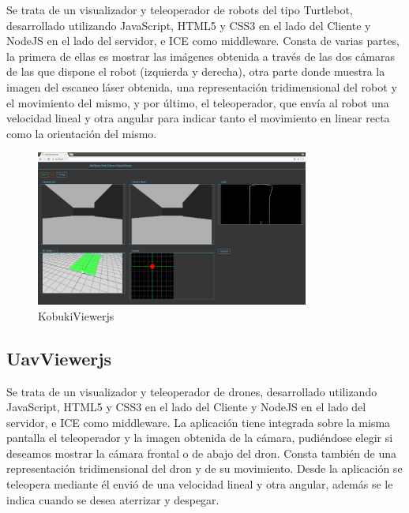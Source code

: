 Se trata de un visualizador y teleoperador de robots del tipo Turtlebot, desarrollado utilizando JavaScript, HTML5 y CSS3 en el lado del Cliente y NodeJS en el lado del servidor, e ICE como middleware. Consta de varias partes, la primera de ellas es mostrar las imágenes obtenida a través de las dos cámaras de las que dispone el robot (izquierda y derecha), otra parte donde muestra la imagen del escaneo láser obtenida, una representación tridimensional del robot y el movimiento del mismo, y por último, el teleoperador, que envía al robot una velocidad lineal y otra angular para indicar tanto el movimiento en linear recta como la orientación del mismo.

\begin{figure}[H]
  \begin{center}
    \includegraphics[width=0.8\textwidth]{figures/kobukiviewerjs.png}
		\caption{KobukiViewerjs}
		\label{fig.kobukiviewerjs}
		\end{center}
\end{figure}

\subsection{UavViewerjs}

Se trata de un visualizador y teleoperador de drones, desarrollado utilizando JavaScript, HTML5 y CSS3 en el lado del Cliente y NodeJS en el lado del servidor, e ICE como middleware. La aplicación tiene integrada sobre la misma pantalla el teleoperador y la imagen obtenida de la cámara, pudiéndose elegir si deseamos mostrar la cámara frontal o de abajo del dron. Consta también de una representación tridimensional del dron y de su movimiento. Desde la aplicación se teleopera mediante él envió de una velocidad lineal y otra angular, además se le indica cuando se desea aterrizar y despegar.

